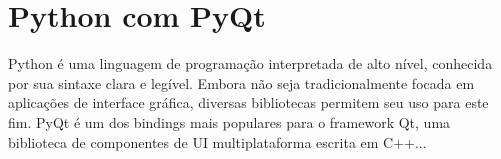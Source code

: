 \section{Python com PyQt}
\label{sec:python_pyqt}

Python é uma linguagem de programação interpretada de alto nível, conhecida por sua sintaxe clara e legível. Embora não seja tradicionalmente focada em aplicações de interface gráfica, diversas bibliotecas permitem seu uso para este fim. PyQt é um dos bindings mais populares para o framework Qt, uma biblioteca de componentes de UI multiplataforma escrita em C++...

